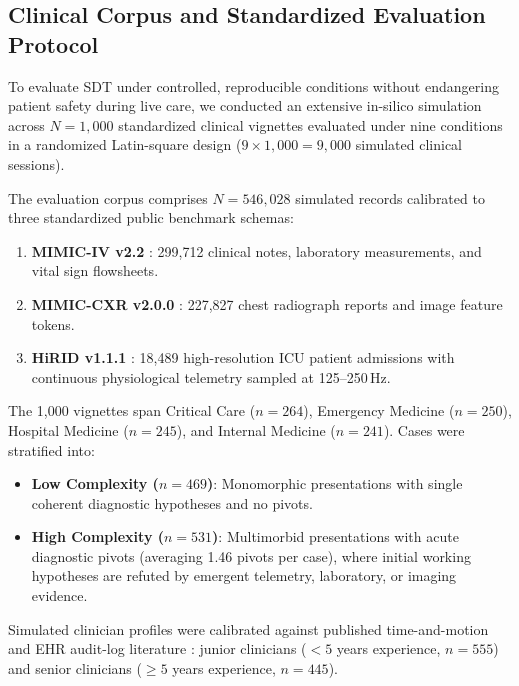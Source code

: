 \documentclass[ijds,dblanonrev]{informs4}
\begin{document}
\subsection{Clinical Corpus and Standardized Evaluation Protocol}
To evaluate SDT under controlled, reproducible conditions without endangering patient safety during live care, we conducted an extensive in-silico simulation across $N = 1{,}000$ standardized clinical vignettes evaluated under nine conditions in a randomized Latin-square design ($9 \times 1{,}000 = 9{,}000$ simulated clinical sessions).

The evaluation corpus comprises $N = 546{,}028$ simulated records calibrated to three standardized public benchmark schemas:
\begin{enumerate}[(1)]
  \item \textbf{MIMIC-IV v2.2} \citep{johnson2023mimic}: 299{,}712 clinical notes, laboratory measurements, and vital sign flowsheets.
  \item \textbf{MIMIC-CXR v2.0.0} \citep{johnson2019mimiccxr}: 227{,}827 chest radiograph reports and image feature tokens.
  \item \textbf{HiRID v1.1.1} \citep{hyland2020hirid}: 18{,}489 high-resolution ICU patient admissions with continuous physiological telemetry sampled at 125--250\,Hz.
\end{enumerate}

The 1{,}000 vignettes span Critical Care ($n=264$), Emergency Medicine ($n=250$), Hospital Medicine ($n=245$), and Internal Medicine ($n=241$). Cases were stratified into:
\begin{itemize}
  \item \textbf{Low Complexity ($n=469$)}: Monomorphic presentations with single coherent diagnostic hypotheses and no pivots.
  \item \textbf{High Complexity ($n=531$)}: Multimorbid presentations with acute diagnostic pivots (averaging 1.46 pivots per case), where initial working hypotheses are refuted by emergent telemetry, laboratory, or imaging evidence.
\end{itemize}
Simulated clinician profiles were calibrated against published time-and-motion and EHR audit-log literature \citep{sinsky2016allocation,zheng2021analyzing}: junior clinicians ($<5$ years experience, $n=555$) and senior clinicians ($\ge 5$ years experience, $n=445$).
\end{document}
